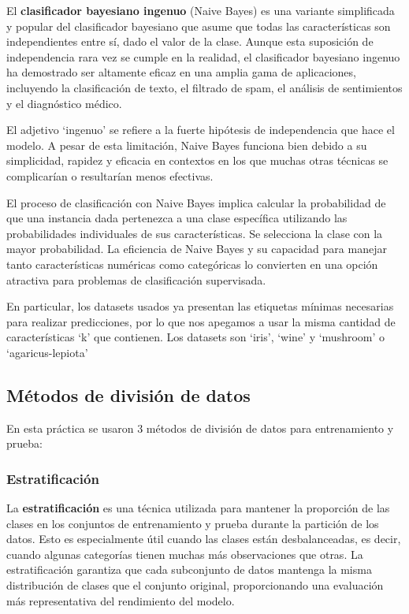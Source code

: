 \documentclass{article}
\begin{document}
El \textbf{clasificador bayesiano ingenuo} (Naive Bayes) es una variante simplificada y popular del clasificador bayesiano que asume que todas las características son independientes entre sí, dado el valor de la clase. Aunque esta suposición de independencia rara vez se cumple en la realidad, el clasificador bayesiano ingenuo ha demostrado ser altamente eficaz en una amplia gama de aplicaciones, incluyendo la clasificación de texto, el filtrado de spam, el análisis de sentimientos y el diagnóstico médico.

El adjetivo `ingenuo' se refiere a la fuerte hipótesis de independencia que hace el modelo. A pesar de esta limitación, Naive Bayes funciona bien debido a su simplicidad, rapidez y eficacia en contextos en los que muchas otras técnicas se complicarían o resultarían menos efectivas.

El proceso de clasificación con Naive Bayes implica calcular la probabilidad de que una instancia dada pertenezca a una clase específica utilizando las probabilidades individuales de sus características. Se selecciona la clase con la mayor probabilidad. La eficiencia de Naive Bayes y su capacidad para manejar tanto características numéricas como categóricas lo convierten en una opción atractiva para problemas de clasificación supervisada.

En particular, los datasets usados ya presentan las etiquetas mínimas necesarias para realizar predicciones, por lo que nos apegamos a usar la misma cantidad de características `k' que contienen. Los datasets son `iris', `wine' y `mushroom' o `agaricus-lepiota'

\subsection{Métodos de división de datos}
En esta práctica se usaron 3 métodos de división de datos para entrenamiento y prueba:

\subsubsection{Estratificación}

La \textbf{estratificación} es una técnica utilizada para mantener la proporción de las clases en los conjuntos de entrenamiento y prueba durante la partición de los datos. Esto es especialmente útil cuando las clases están desbalanceadas, es decir, cuando algunas categorías tienen muchas más observaciones que otras. La estratificación garantiza que cada subconjunto de datos mantenga la misma distribución de clases que el conjunto original, proporcionando una evaluación más representativa del rendimiento del modelo.
\end{document}

